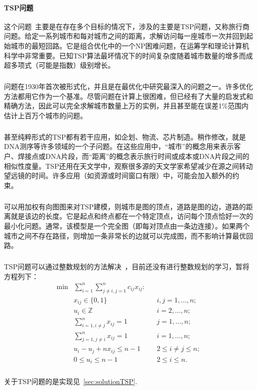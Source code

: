 \documentclass[UTF8,a4paper]{ctexart}
\begin{document}
\paragraph{TSP问题}这个问题~\cite{tsptheory}主要是在存在多个目标的情况下，涉及的主要是TSP问题，又称旅行商问题。给定一系列城市和每对城市之间的距离，求解访问每一座城市一次并回到起始城市的最短回路。它是组合优化中的一个NP困难问题，在运筹学和理论计算机科学中非常重要。已知TSP算法最坏情况下的时间复杂度随着城市数量的增多而成超多项式（可能是指数）级别增长。
\subparagraph{}问题在1930年首次被形式化，并且是在最优化中研究最深入的问题之一。许多优化方法都用它作为一个基准。尽管问题在计算上很困难，但已经有了大量的启发式和精确方法，因此可以完全求解城市数量上万的实例，并且甚至能在误差1\%范围内估计上百万个城市的问题。
\subparagraph{}甚至纯粹形式的TSP都有若干应用，如企划、物流、芯片制造。稍作修改，就是DNA测序等许多领域的一个子问题。在这些应用中，“城市”的概念用来表示客户、焊接点或DNA片段，而“距离”的概念表示旅行时间或成本或DNA片段之间的相似性度量。TSP还用在天文学中，观察很多源的天文学家希望减少在源之间转动望远镜的时间。许多应用（如资源或时间窗口有限）中，可能会加入额外的约束。~\cite{worldtsp}
\subparagraph{}可以用加权有向图图来对TSP建模，则城市是图的顶点，道路是图的边，道路的距离就是该边的长度。它是起点和终点都在一个特定顶点，访问每个顶点恰好一次的最小化问题。通常，该模型是一个完全图（即每对顶点由一条边连接）。如果两个城市之间不存在路径，则增加一条非常长的边就可以完成图，而不影响计算最优回路。
\subparagraph{}TSP问题可以通过整数规划的方法解决~\cite{papadimi}，目前还没有进行整数规划的学习，暂将方程列下：
\begin{align}
    \min & \sum _{i=1}^{n}\sum _{j\neq i,j=1}^{n}c_{ij}x_{ij}\colon &  &                      \\
         & x_{ij}\in \{0,1\}                                        &  & i,j=1,\ldots ,n;     \\
         & u_{i}\in  \mathbb{Z}                                     &  & i=2,\ldots ,n;       \\
         & \sum _{i=1,i\neq j}^{n}x_{ij}=1                          &  & j=1,\ldots ,n;       \\
         & \sum _{j=1,j\neq i}^{n}x_{ij}=1                          &  & i=1,\ldots ,n;       \\
         & u_{i}-u_{j}+nx_{ij}\leq n-1                              &  & 2\leq i\neq j\leq n; \\
         & 0\leq u_{i}\leq n-1                                      &  & 2\leq i\leq n.
\end{align}
\subparagraph{}关于TSP问题的是实现见~\ref{sec:solutionTSP}.
\end{document}
